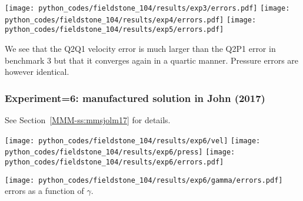 \begin{center}
\texttt{[image: python\_codes/fieldstone\_104/results/exp3/errors.pdf]}
\texttt{[image: python\_codes/fieldstone\_104/results/exp4/errors.pdf]}
\texttt{[image: python\_codes/fieldstone\_104/results/exp5/errors.pdf]}
\end{center}

We see that the Q2Q1 velocity error is much larger than the Q2P1 error in benchmark 3 
but that it converges again in a quartic manner.
Pressure errors are however identical.

\subsubsection*{Experiment=6: manufactured solution in John \etal (2017) \cite{jolm17}}

See Section~\ref{MMM-ss:mmsjolm17} for details.

\begin{center}
\texttt{[image: python\_codes/fieldstone\_104/results/exp6/vel]}
\texttt{[image: python\_codes/fieldstone\_104/results/exp6/press]}
\texttt{[image: python\_codes/fieldstone\_104/results/exp6/errors.pdf]}
\end{center}


\begin{center}
\texttt{[image: python\_codes/fieldstone\_104/results/exp6/gamma/errors.pdf]}\\
{\captionfont errors as a function of $\gamma$.}
\end{center}



